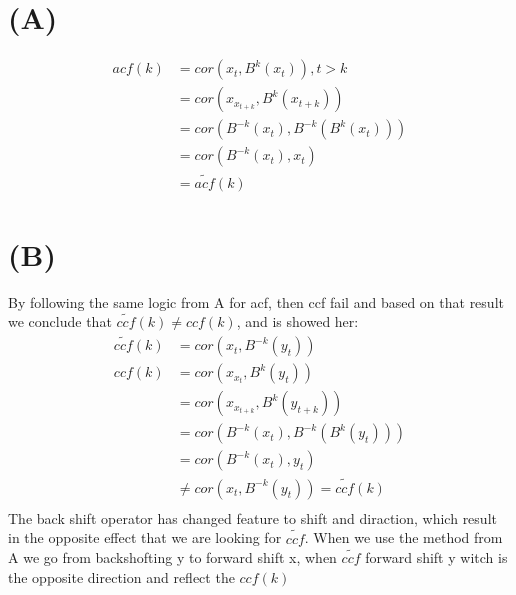 \documentclass[a4paper]{article}
\begin{document}
\section*{(A)}
\begin{align*}
    acf(k) &= cor(x_t, B^k (x_t)), t > k \\
    &= cor(x_{x_{t + k}}, B^k(x_{t + k})) \\
    &= cor( B^{-k}(x_{t}), B^{-k}(B^k( x_t )) ) \\
    &= cor(B^{-k}(x_t), x_t) \\
    &= \tilde{acf}(k)
\end{align*}


\section*{(B)}
By following the same logic from A for acf, then ccf fail and based on 
that result we conclude that $\tilde{ccf}(k) \neq ccf(k)$, and is showed her:
\begin{align*}
    \tilde{ccf}(k) &= cor(x_t, B^{-k}(y_t)) \\
    ccf(k) &= cor(x_{x_{t}}, B^k(y_{t})) \\
    &= cor(x_{x_{t + k}}, B^k(y_{t + k})) \\
    &= cor( B^{-k}(x_{t}), B^{-k}(B^k( y_t )) ) \\
    &= cor(B^{-k}(x_t), y_t) \\
    & \neq  cor(x_t, B^{-k}(y_t)) = \tilde{ccf}(k)\\
\end{align*}
The back shift operator has changed feature to shift and diraction, which result 
in the opposite effect that we are looking for $\tilde{ccf}$. When we use the method from A 
we go from backshofting y to forward shift x, when $\tilde{ccf}$ forward shift y witch is 
the opposite direction and reflect the $ccf(k)$
\end{document}
